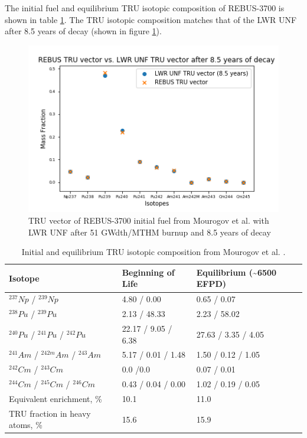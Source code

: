 The initial fuel and equilibrium \gls{TRU} isotopic composition of REBUS-3700 is
shown in table \ref{tab:rebus_comp}. The \gls{TRU} isotopic composition
matches that of the \gls{LWR} \gls{UNF} after 8.5 years of decay (shown
in figure \ref{fig:trutru}).


\begin{figure}[htbp!]
	\begin{center}
		\includegraphics[scale=0.7]{./images/us/trutru.png}
	\end{center}
	\caption{\gls{TRU} vector of REBUS-3700 initial fuel from Mourogov et al. \cite{mourogov_potentialities_2006}
		with \gls{LWR} \gls{UNF} after 51 GWdth/MTHM burnup and 8.5 years of decay}
	\label{fig:trutru}
\end{figure}


\begin{table}[h]
	\centering
	\caption{Initial and equilibrium \gls{TRU} isotopic composition from Mourogov et al. \cite{mourogov_potentialities_2006}.}
	\label{tab:rebus_comp}
	\begin{tabularx}{\textwidth}{lll}
		\hline
		Isotope & Beginning of Life & Equilibrium (\textasciitilde 6500 \gls{EFPD}) \\
		\hline
		$^{237} Np$ / $^{239} Np$ &  4.80 / 0.00 & 0.65 / 0.07 \\
		$^{238} Pu$ / $^{239} Pu$ & 2.13 / 48.33  & 2.23 / 58.02  \\
		$^{240} Pu$ / $^{241} Pu$ / $^{242} Pu$ & 22.17 / 9.05 / 6.38 & 27.63 / 3.35 / 4.05 \\
		$^{241} Am$ / $^{242m} Am$ / $^{243} Am$ &5.17 / 0.01 / 1.48 & 1.50 / 0.12 / 1.05 \\
		$^{242} Cm$ / $^{243} Cm$  & 0.0 /0.0  & 0.07 / 0.01  \\
		$^{244} Cm$ / $^{245} Cm$ / $^{246} Cm$ & 0.43 / 0.04 / 0.00 & 1.02 / 0.19 / 0.05 \\
		Equivalent enrichment, \% & 10.1 & 11.0 \\
		\gls{TRU} fraction in heavy atoms, \% & 15.6 & 15.9 \\
		\hline
	\end{tabularx}
\end{table}


